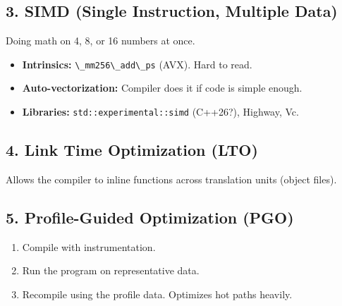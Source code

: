 \hypertarget{simd-single-instruction-multiple-data}{%
\subsection{3. SIMD (Single Instruction, Multiple
Data)}\label{simd-single-instruction-multiple-data}}

Doing math on 4, 8, or 16 numbers at once.

\begin{itemize}
\tightlist
\item
  \textbf{Intrinsics:} \passthrough{\lstinline!\_mm256\_add\_ps!} (AVX).
  Hard to read.
\item
  \textbf{Auto-vectorization:} Compiler does it if code is simple
  enough.
\item
  \textbf{Libraries:} \passthrough{\lstinline!std::experimental::simd!}
  (C++26?), Highway, Vc.
\end{itemize}

\hypertarget{link-time-optimization-lto}{%
\subsection{4. Link Time Optimization
(LTO)}\label{link-time-optimization-lto}}

Allows the compiler to inline functions across translation units (object
files).

\hypertarget{profile-guided-optimization-pgo}{%
\subsection{5. Profile-Guided Optimization
(PGO)}\label{profile-guided-optimization-pgo}}

\begin{enumerate}
\def\labelenumi{\arabic{enumi}.}
\tightlist
\item
  Compile with instrumentation.
\item
  Run the program on representative data.
\item
  Recompile using the profile data. Optimizes hot paths heavily.
\end{enumerate}

